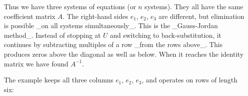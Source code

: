 Thus we have three systems of equations (or \(n\) systems). They all have the same coefficient matrix \(A\). The right-hand sides \(e_{1}\), \(e_{2}\), \(e_{3}\) are different, but elimination is possible _on all systems simultaneously_. This is the _Gauss-Jordan method_. Instead of stopping at \(U\) and switching to back-substitution, it continues by subtracting multiples of a row _from the rows above_. This produces zeros above the diagonal as well as below. When it reaches the identity matrix we have found \(A^{-1}\).

The example keeps all three columns \(e_{1}\), \(e_{2}\), \(e_{3}\), and operates on rows of length six: 